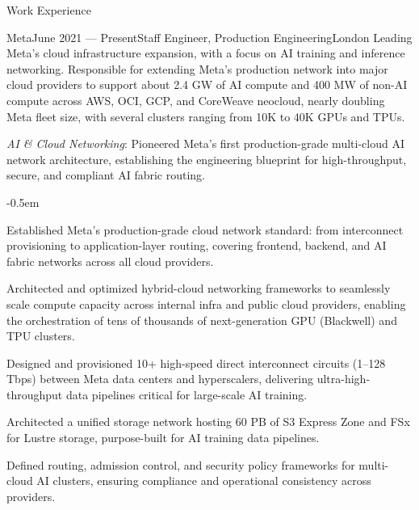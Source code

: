 \documentclass{resume} %
\begin{document}

\begin{rSection}{Work Experience}

\begin{rSubsection}{Meta}{June 2021 --- Present}{Staff Engineer, Production Engineering}{London}
{Leading Meta's cloud infrastructure expansion, with a focus on AI training and inference networking. Responsible for extending Meta's production network into major cloud providers to support about 2.4 GW of AI compute and 400 MW of non-AI compute across AWS, OCI, GCP, and CoreWeave neocloud, nearly doubling Meta fleet size, with several clusters ranging from 10K to 40K GPUs and TPUs.}

\item {\em AI \& Cloud  Networking}:
Pioneered Meta’s first production-grade multi-cloud AI network architecture, establishing the  engineering blueprint for high-throughput, secure, and compliant AI fabric routing.

\begin{itemize}
\renewcommand\labelitemi{--}
{\small
\itemsep -0.5em
\item Established Meta's production-grade cloud network standard: from interconnect provisioning to application-layer routing, covering frontend, backend, and AI fabric networks across all cloud providers.
\item Architected and optimized hybrid-cloud networking frameworks to seamlessly scale compute capacity across internal infra and public cloud providers, enabling the orchestration of tens of thousands of next-generation GPU (Blackwell) and TPU clusters.
\item Designed and provisioned 10+ high-speed direct interconnect circuits (1–128 Tbps) between Meta data centers and hyperscalers, delivering ultra-high-throughput data pipelines critical for large-scale AI training.
\item Architected a unified storage network hosting 60 PB of S3 Express Zone and FSx for Lustre storage, purpose-built for AI training data pipelines.
\item Defined routing, admission control, and security policy frameworks for multi-cloud AI clusters, ensuring compliance and operational consistency across providers.
}
\end{itemize}
\end{rSubsection} \vspace{-2em}


\end{rSection}
\end{document}
